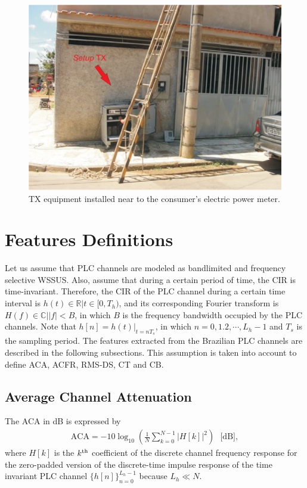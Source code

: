 \documentclass[journal]{IEEEtran}
\begin{document}
\begin{figure}[!htp]
	\begin{centering}		
	\includegraphics[scale=.4]{Figuras/setupTXnoconsumidor.eps}
	\caption{TX equipment installed near to the consumer's electric power meter.}
		\label{Fig:setupRX}
	\end{centering}
\end{figure}

\section{Features Definitions}
\label{sec:parameters}

Let us assume that \ac{PLC} channels are modeled as bandlimited and frequency selective \ac{WSSUS}. Also, assume that during a certain period of time, the \ac{CIR} is time-invariant. Therefore, the \ac{CIR} of the \ac{PLC} channel during a certain time interval is $ h(t)\in \mathbb{R}|t\in[0,T_h)$,  and its corresponding Fourier transform is $H(f)\in \mathbb{C}||f|<B$, in which $B$ is the frequency bandwidth occupied by the \ac{PLC} channels. Note that $h[n]=h(t)|_{t=nT_s}$, in which $n=0,1.2,\cdots,L_h-1 $ and $T_s$ is the sampling period. The features extracted from the Brazilian PLC channels are described in the following subsections. This assumption is taken into account to define \ac{ACA}, \ac{ACFR}, \ac{RMS-DS}, \ac{CT} and \ac{CB}.

\subsection{Average Channel Attenuation}
The ACA in dB is expressed by
\begin{eqnarray}
	\textrm{ACA}=-10\log_{10}\left(\frac{1}{N}\sum_{k=0}^{N-1}|H[k]|^2\right) \ \ \ \mbox{[dB]},
\end{eqnarray}
where $H[k]$ is the $k^{\rm th}$ coefficient of the discrete channel frequency response for the zero-padded version of the discrete-time impulse response of the time invariant PLC channel $\{h[n]\}_{n=0}^{L_h-1}$ because $L_h \ll N$.
\end{document}
